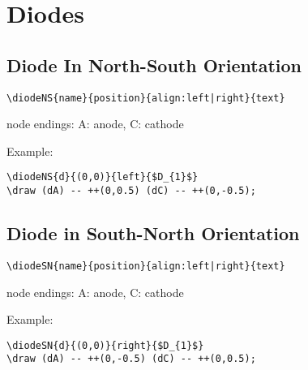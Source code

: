 \documentclass[parskip=full]{scrartcl}
\begin{document}
\section{Diodes}

\subsection{Diode In North-South Orientation}

\begin{verbatim}
\diodeNS{name}{position}{align:left|right}{text}
\end{verbatim}
node endings: A: anode, C: cathode

Example:\\
\begin{minipage}{0.8\textwidth}
\begin{verbatim}
\diodeNS{d}{(0,0)}{left}{$D_{1}$}
\draw (dA) -- ++(0,0.5) (dC) -- ++(0,-0.5);
\end{verbatim}
\end{minipage}
\begin{minipage}{0.19\textwidth}
\end{minipage}

\subsection{Diode in South-North Orientation}

\begin{verbatim}
\diodeSN{name}{position}{align:left|right}{text}
\end{verbatim}
node endings: A: anode, C: cathode

Example:\\
\begin{minipage}{0.8\textwidth}
\begin{verbatim}
\diodeSN{d}{(0,0)}{right}{$D_{1}$}
\draw (dA) -- ++(0,-0.5) (dC) -- ++(0,0.5);
\end{verbatim}
\end{minipage}
\begin{minipage}{0.19\textwidth}
\end{minipage}
\end{document}
